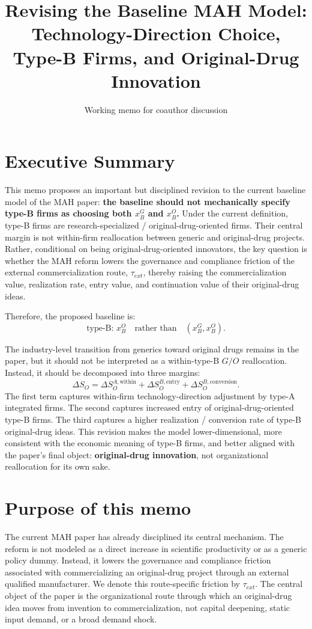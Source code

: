 \documentclass[12pt]{article}
\title{Revising the Baseline MAH Model:\\Technology-Direction Choice, Type-B Firms, and Original-Drug Innovation}
\author{}
\date{Working memo for coauthor discussion}
\begin{document}
\maketitle

\section*{Executive Summary}

This memo proposes an important but disciplined revision to the current baseline model of the MAH paper: \textbf{the baseline should not mechanically specify type-B firms as choosing both $x_B^G$ and $x_B^O$.} Under the current definition, type-B firms are research-specialized / original-drug-oriented firms. Their central margin is not within-firm reallocation between generic and original-drug projects. Rather, conditional on being original-drug-oriented innovators, the key question is whether the MAH reform lowers the governance and compliance friction of the external commercialization route, $\tau_{ext}$, thereby raising the commercialization value, realization rate, entry value, and continuation value of their original-drug ideas.

Therefore, the proposed baseline is:
\[
\text{type-B: } x_B^O \quad \text{rather than} \quad (x_B^G,x_B^O).
\]

The industry-level transition from generics toward original drugs remains in the paper, but it should not be interpreted as a within-type-B $G/O$ reallocation. Instead, it should be decomposed into three margins:
\[
\Delta S_O
=
\Delta S_O^{A,\mathrm{within}}
+
\Delta S_O^{B,\mathrm{entry}}
+
\Delta S_O^{B,\mathrm{conversion}}.
\]
The first term captures within-firm technology-direction adjustment by type-A integrated firms. The second captures increased entry of original-drug-oriented type-B firms. The third captures a higher realization / conversion rate of type-B original-drug ideas. This revision makes the model lower-dimensional, more consistent with the economic meaning of type-B firms, and better aligned with the paper's final object: \textbf{original-drug innovation}, not organizational reallocation for its own sake.

\section{Purpose of this memo}

The current MAH paper has already disciplined its central mechanism. The reform is not modeled as a direct increase in scientific productivity or as a generic policy dummy. Instead, it lowers the governance and compliance friction associated with commercializing an original-drug project through an external qualified manufacturer. We denote this route-specific friction by $\tau_{ext}$. The central object of the paper is the organizational route through which an original-drug idea moves from invention to commercialization, not capital deepening, static input demand, or a broad demand shock.
\end{document}
